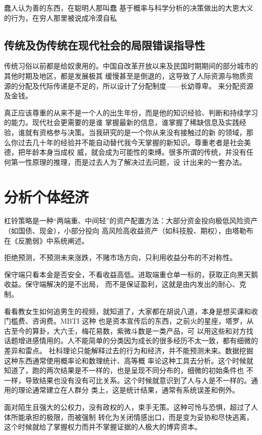 \documentclass{book}
\begin{document}
蠢人认为善的东西，在聪明人那叫蠢
基于概率与科学分析的决策做出的大恩大义的行为，在穷人那里被说成冷漠自私

\section{传统及伪传统在现代社会的局限错误指导性}

传统习俗以前都是给奴隶用的。中国自改革开放以来及民国时期期间的部分城市的其他时期及地区，都是发展极其
缓慢甚至是倒退的，这导致了人际资源与物质资源的分配及代际传递是不足的，所以设计了分配制度——长幼尊卑。
来分配资源及金钱。

真正应该尊重的从来不是一个人的出生年份，而是他的知识经验、判断和持续学习的能力。现代社会更需要的是谁
掌握最新的信息，谁掌握了稀缺信息及实践经验，谁就有资格参与决策。当我研究的是一个你从来没有接触过的新
的领域，那么你过去几十年的经验并不能自动替代我今天掌握的新知识。尊重老者是社会美德，把年龄本身当成权
威，就会成为可能性的束缚。很多所谓的传统，并没有任何第一性原理的推理，而是过去人为了解决过去问题，设
计出来的一套办法。

\chapter{分析个体经济}

杠铃策略是一种“两端重、中间轻”的资产配置方法：大部分资金投向极低风险资产（如国债、现金），小部分投向
高风险高收益资产（如科技股、期权），由塔勒布在《反脆弱》中系统阐述。

拒绝预测，不预测未来涨跌，不赌市场方向，只利用收益分布的不对称性。

保守端只看本金是否安全，不看收益高低。进取端重仓单一标的，获取正向黑天鹅收益。保守端解决的是不出局，
而不是保证盈利，这就是由内发出的耐心、克制。

看看教女生如何追男生的视频，就知道了，大家都在胡说八道，本身是想买课和收门槛费、咨询费。MBTI 这种
也是资本宣传后的东西，之前火的星座，塔罗，从古至今的算卦，大六壬，梅花易数，紫微斗数是一类产品，可
以用这些和对方找话题增进感情用的。人不能简单的分类因为成长的很多经历不太一致，都有细微的差异和雷点。
社科理论只能解释过去的行为和经济，并不能预测未来。数据挖掘这种东西通常使用概率论和数理统计、高等概
率论这种工具去分析。这个时候就知道了，跑的两次结果是不一样的，也是呈现不同分布的，细微的初始条件也
不一样，导致结果也没有没有可比关系。这个时候就意识到了人与人是不一样的。通用的理论通常建立在人群分
类上，这是统计结果，通常有系统误差和例外。

面对陌生且强大的公权力，没有政权的人，束手无策。这种可怜与恐惧，超过了人体所能承担的极限，而被强制
转化为关闭情感出口，而是变为妥协和尽快逃离，这个时候就给了掌握权力而并不掌握证据的人极大的博弈资本。
\end{document}
